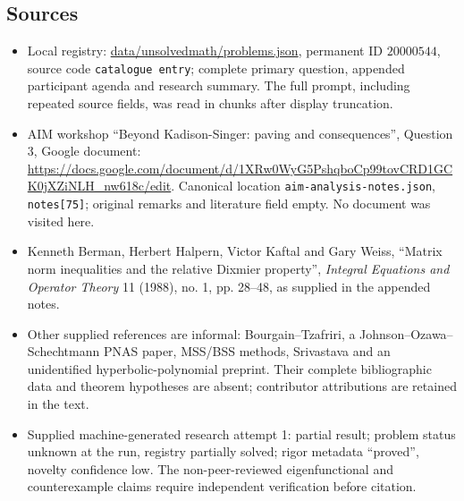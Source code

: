\documentclass[11pt]{article}
\begin{document}
\subsection{Sources}
\begin{itemize}
\item Local registry: \url{data/unsolvedmath/problems.json}, permanent ID $20000544$, source code \texttt{catalogue entry}; complete primary question, appended participant agenda and research summary. The full prompt, including repeated source fields, was read in chunks after display truncation.
\item AIM workshop ``Beyond Kadison-Singer: paving and consequences'', Question 3, Google document: \url{https://docs.google.com/document/d/1XRw0WyG5PshqboCp99tovCRD1GCK0jXZiNLH_nw618c/edit}. Canonical location \texttt{aim-analysis-notes.json}, \texttt{notes[75]}; original remarks and literature field empty. No document was visited here.
\item Kenneth Berman, Herbert Halpern, Victor Kaftal and Gary Weiss, ``Matrix norm inequalities and the relative Dixmier property'', \textit{Integral Equations and Operator Theory} 11 (1988), no. 1, pp. 28--48, as supplied in the appended notes.
\item Other supplied references are informal: Bourgain--Tzafriri, a Johnson--Ozawa--Schechtmann PNAS paper, MSS/BSS methods, Srivastava and an unidentified hyperbolic-polynomial preprint. Their complete bibliographic data and theorem hypotheses are absent; contributor attributions are retained in the text.
\item Supplied machine-generated research attempt 1: partial result; problem status unknown at the run, registry partially solved; rigor metadata ``proved'', novelty confidence low. The non-peer-reviewed eigenfunctional and counterexample claims require independent verification before citation.
\end{itemize}
\end{document}
